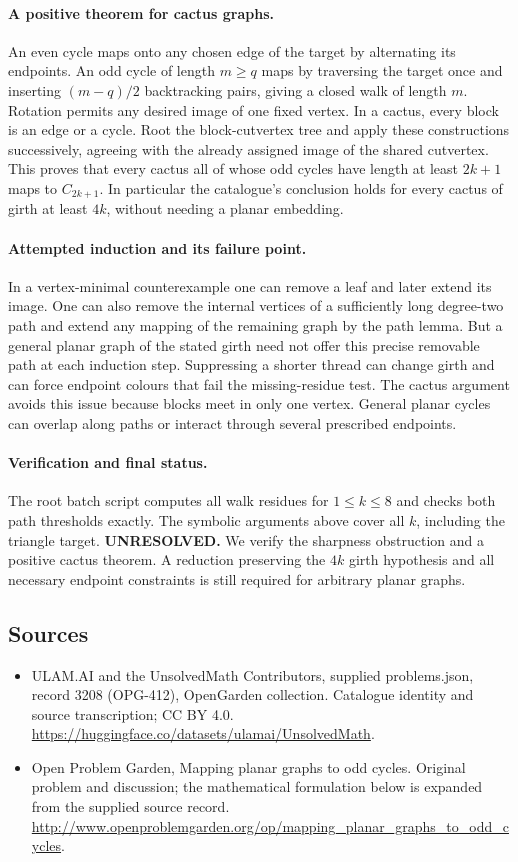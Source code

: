 \documentclass[11pt,a4paper]{article}
\begin{document}
\paragraph{A positive theorem for cactus graphs.}
An even cycle maps onto any chosen edge of the target by alternating its
endpoints. An odd cycle of length $m\ge q$ maps by traversing the target
once and inserting $(m-q)/2$ backtracking pairs, giving a closed walk of
length $m$. Rotation permits any desired image of one fixed vertex.
In a cactus, every block is an edge or a cycle. Root the block-cutvertex
tree and apply these constructions successively, agreeing with the
already assigned image of the shared cutvertex. This proves that every
cactus all of whose odd cycles have length at least $2k+1$ maps to
$C_{2k+1}$. In particular the catalogue's conclusion holds for every
cactus of girth at least $4k$, without needing a planar embedding.

\paragraph{Attempted induction and its failure point.}
In a vertex-minimal counterexample one can remove a leaf and later extend
its image. One can also remove the internal vertices of a sufficiently
long degree-two path and extend any mapping of the remaining graph by
the path lemma. But a general planar graph of the stated girth need not
offer this precise removable path at each induction step. Suppressing a
shorter thread can change girth and can force endpoint colours that fail
the missing-residue test. The cactus argument avoids this issue because
blocks meet in only one vertex. General planar cycles can overlap along
paths or interact through several prescribed endpoints.

\paragraph{Verification and final status.}
The root batch script computes all walk residues for $1\le k\le8$ and
checks both path thresholds exactly. The symbolic arguments above cover
all $k$, including the triangle target. \textbf{UNRESOLVED.} We verify the
sharpness obstruction and a positive cactus theorem. A reduction preserving
the $4k$ girth hypothesis and all necessary endpoint constraints is still
required for arbitrary planar graphs.

\subsection{Sources}
\begin{itemize}
\item[S1] ULAM.AI and the UnsolvedMath Contributors, supplied problems.json, record 3208 (OPG-412), OpenGarden collection. Catalogue identity and source transcription; CC BY 4.0.
\url{https://huggingface.co/datasets/ulamai/UnsolvedMath}.
\item[S2] Open Problem Garden, Mapping planar graphs to odd cycles. Original problem and discussion; the mathematical formulation below is expanded from the supplied source record.
\url{http://www.openproblemgarden.org/op/mapping_planar_graphs_to_odd_cycles}.

\end{itemize}
\end{document}
